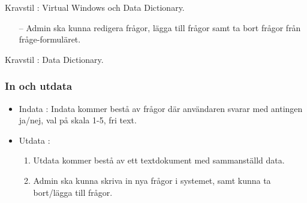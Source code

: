 \documentclass{article}
\begin{document}
\begin{itemize}
\begin{itemize}
        \end{itemize}
          \begin{description}
              \item Kravstil : Virtual Windows och Data Dictionary.
          \end{description}
          
          \begin{itemize}
            \item [--]Admin ska kunna redigera frågor, lägga till frågor samt ta bort frågor från fråge-formuläret.

        \end{itemize}
          \begin{description}
              \item Kravstil : Data Dictionary.
          \end{description}
    \end{itemize}
  
 \subsubsection{In och utdata}
   \begin{itemize}
       \item Indata : Indata kommer bestå av frågor där användaren svarar med antingen ja/nej, val på skala 1-5, fri text.
          
          \item Utdata :
            \begin{enumerate}
                \item  Utdata kommer bestå av ett textdokument med sammanställd data.
                \item Admin ska kunna skriva in nya frågor i systemet, samt kunna ta bort/lägga till frågor.
            \end{enumerate}
              
   \end{itemize}
   
\end{document}
